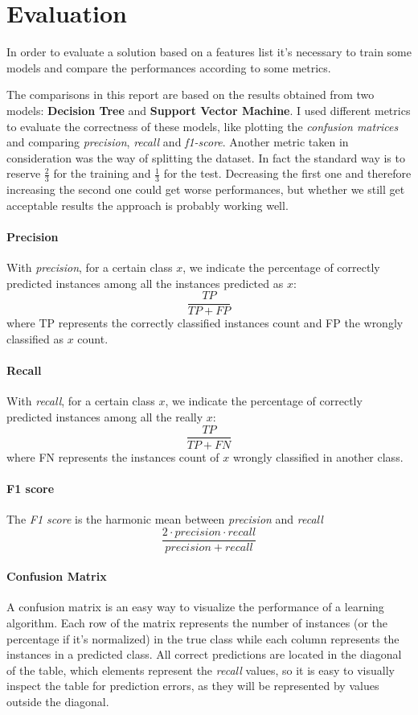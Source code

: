 \documentclass[11pt]{article}
\begin{document}
	\section{Evaluation}
	In order to evaluate a solution based on a features list it's necessary to
	train some models and compare the performances according to some metrics.

	The comparisons in this report are based on the results obtained from two
	models: \textbf{Decision Tree} and \textbf{Support Vector Machine}.
	I used different metrics to evaluate the correctness of these models, like
	plotting the \textit{confusion matrices} and comparing \textit{precision},
	\textit{recall} and \textit{f1-score}.
	Another metric taken in consideration was the way of splitting the dataset.
	In fact the standard way is to reserve $\frac{2}{3}$ for the training
	and $\frac{1}{3}$ for the test. Decreasing the first one and therefore
	increasing the second one could get worse performances, but whether we still
	get acceptable results the approach is probably working well.

	\paragraph{Precision}
	With \textit{precision}, for a certain class $x$, we indicate the percentage of correctly
	predicted instances among all the instances predicted as $x$:
	\[
		\frac{TP}{TP + FP}
	\]
	where TP represents the correctly classified instances count and FP the wrongly
	classified as $x$ count.

	\paragraph{Recall}
	With \textit{recall}, for a certain class $x$, we indicate the percentage of correctly
	predicted instances among all the really $x$:
	\[
		\frac{TP}{TP + FN}
	\]
	where FN represents the instances count of $x$ wrongly classified in another class.

	\paragraph{F1 score}
	The \textit{F1 score} is the harmonic mean between \textit{precision} and \textit{recall}
	\[
		\frac{2 \cdot precision \cdot recall}{precision + recall}
	\]

	\paragraph{Confusion Matrix}
	A confusion matrix is an easy way to visualize the performance of a learning algorithm. 
	Each row of the matrix represents the number of instances (or the percentage
	if it's normalized) in the true class while each column represents the instances in
	a predicted class.
	All correct predictions are located in the diagonal of the table, which elements
	represent the \textit{recall} values, so it is easy to visually inspect the table
	for prediction errors, as they will be represented by values outside the diagonal.
\end{document}
